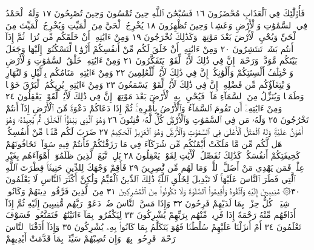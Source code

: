فَأُو۟لَٰٓئِكَ فِي ٱلْعَذَابِ مُحْضَرُونَ ١٦ فَسُبْحَٰنَ ٱللَّهِ حِينَ تُمْسُونَ
وَحِينَ تُصْبِحُونَ ١٧ وَلَهُ ٱلْحَمْدُ فِي ٱلسَّمَٰوَٰتِ وَٱلْأَرْضِ
وَعَشِيࣰّا وَحِينَ تُظْهِرُونَ ١٨ يُخْرِجُ ٱلْحَيَّ مِنَ ٱلْمَيِّتِ وَيُخْرِجُ
ٱلْمَيِّتَ مِنَ ٱلْحَيِّ وَيُحْيِ ٱلْأَرْضَ بَعْدَ مَوْتِهَاۚ وَكَذَٰلِكَ تُخْرَجُونَ ١٩
وَمِنْ ءَايَٰتِهِۦٓ أَنْ خَلَقَكُم مِّن تُرَابࣲ ثُمَّ إِذَآ أَنتُم بَشَرࣱ
تَنتَشِرُونَ ٢٠ وَمِنْ ءَايَٰتِهِۦٓ أَنْ خَلَقَ لَكُم مِّنْ أَنفُسِكُمْ
أَزْوَٰجࣰا لِّتَسْكُنُوٓا۟ إِلَيْهَا وَجَعَلَ بَيْنَكُم مَّوَدَّةࣰ وَرَحْمَةًۚ
إِنَّ فِي ذَٰلِكَ لَأٓيَٰتࣲ لِّقَوْمࣲ يَتَفَكَّرُونَ ٢١ وَمِنْ ءَايَٰتِهِۦ
خَلْقُ ٱلسَّمَٰوَٰتِ وَٱلْأَرْضِ وَٱخْتِلَٰفُ أَلْسِنَتِكُمْ وَأَلْوَٰنِكُمْۚ
إِنَّ فِي ذَٰلِكَ لَأٓيَٰتࣲ لِّلْعَٰلِمِينَ ٢٢ وَمِنْ ءَايَٰتِهِۦ مَنَامُكُم
بِٱلَّيْلِ وَٱلنَّهَارِ وَٱبْتِغَآؤُكُم مِّن فَضْلِهِۦٓۚ إِنَّ فِي ذَٰلِكَ
لَأٓيَٰتࣲ لِّقَوْمࣲ يَسْمَعُونَ ٢٣ وَمِنْ ءَايَٰتِهِۦ يُرِيكُمُ ٱلْبَرْقَ
خَوْفࣰا وَطَمَعࣰا وَيُنَزِّلُ مِنَ ٱلسَّمَآءِ مَآءࣰ فَيُحْيِۦ بِهِ ٱلْأَرْضَ
بَعْدَ مَوْتِهَآۚ إِنَّ فِي ذَٰلِكَ لَأٓيَٰتࣲ لِّقَوْمࣲ يَعْقِلُونَ ٢٤
وَمِنْ ءَايَٰتِهِۦٓ أَن تَقُومَ ٱلسَّمَآءُ وَٱلْأَرْضُ بِأَمْرِهِۦۚ ثُمَّ إِذَا دَعَاكُمْ
دَعْوَةࣰ مِّنَ ٱلْأَرْضِ إِذَآ أَنتُمْ تَخْرُجُونَ ٢٥ وَلَهُۥ مَن فِي ٱلسَّمَٰوَٰتِ
وَٱلْأَرْضِۖ كُلࣱّ لَّهُۥ قَٰنِتُونَ ٢٦ وَهُوَ ٱلَّذِي يَبْدَؤُا۟ ٱلْخَلْقَ ثُمَّ
يُعِيدُهُۥ وَهُوَ أَهْوَنُ عَلَيْهِۚ وَلَهُ ٱلْمَثَلُ ٱلْأَعْلَىٰ فِي ٱلسَّمَٰوَٰتِ
وَٱلْأَرْضِۚ وَهُوَ ٱلْعَزِيزُ ٱلْحَكِيمُ ٢٧ ضَرَبَ لَكُم مَّثَلࣰا
مِّنْ أَنفُسِكُمْۖ هَل لَّكُم مِّن مَّا مَلَكَتْ أَيْمَٰنُكُم مِّن
شُرَكَآءَ فِي مَا رَزَقْنَٰكُمْ فَأَنتُمْ فِيهِ سَوَآءࣱ تَخَافُونَهُمْ
كَخِيفَتِكُمْ أَنفُسَكُمْۚ كَذَٰلِكَ نُفَصِّلُ ٱلْأٓيَٰتِ لِقَوْمࣲ
يَعْقِلُونَ ٢٨ بَلِ ٱتَّبَعَ ٱلَّذِينَ ظَلَمُوٓا۟ أَهْوَآءَهُم بِغَيْرِ عِلْمࣲۖ
فَمَن يَهْدِي مَنْ أَضَلَّ ٱللَّهُۖ وَمَا لَهُم مِّن نَّٰصِرِينَ ٢٩ فَأَقِمْ
وَجْهَكَ لِلدِّينِ حَنِيفࣰاۚ فِطْرَتَ ٱللَّهِ ٱلَّتِي فَطَرَ ٱلنَّاسَ عَلَيْهَاۚ
لَا تَبْدِيلَ لِخَلْقِ ٱللَّهِۚ ذَٰلِكَ ٱلدِّينُ ٱلْقَيِّمُ وَلَٰكِنَّ أَكْثَرَ
ٱلنَّاسِ لَا يَعْلَمُونَ ٣٠۞ مُنِيبِينَ إِلَيْهِ وَٱتَّقُوهُ وَأَقِيمُوا۟
ٱلصَّلَوٰةَ وَلَا تَكُونُوا۟ مِنَ ٱلْمُشْرِكِينَ ٣١ مِنَ ٱلَّذِينَ فَرَّقُوا۟
دِينَهُمْ وَكَانُوا۟ شِيَعࣰاۖ كُلُّ حِزْبِۭ بِمَا لَدَيْهِمْ فَرِحُونَ ٣٢
وَإِذَا مَسَّ ٱلنَّاسَ ضُرࣱّ دَعَوْا۟ رَبَّهُم مُّنِيبِينَ إِلَيْهِ ثُمَّ إِذَآ أَذَاقَهُم
مِّنْهُ رَحْمَةً إِذَا فَرِيقࣱ مِّنْهُم بِرَبِّهِمْ يُشْرِكُونَ ٣٣ لِيَكْفُرُوا۟ بِمَآ
ءَاتَيْنَٰهُمْۚ فَتَمَتَّعُوا۟ فَسَوْفَ تَعْلَمُونَ ٣٤ أَمْ أَنزَلْنَا عَلَيْهِمْ
سُلْطَٰنࣰا فَهُوَ يَتَكَلَّمُ بِمَا كَانُوا۟ بِهِۦ يُشْرِكُونَ ٣٥ وَإِذَآ أَذَقْنَا
ٱلنَّاسَ رَحْمَةࣰ فَرِحُوا۟ بِهَاۖ وَإِن تُصِبْهُمْ سَيِّئَةُۢ بِمَا قَدَّمَتْ أَيْدِيهِمْ
